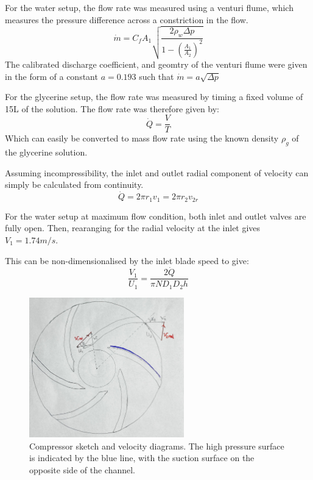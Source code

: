 \documentclass{article}
\begin{document}
For the water setup, the flow rate was measured using a venturi flume, which measures the pressure difference across a constriction in the flow.
\begin{equation}
    \dot{m} = C_f A_1 \sqrt{\frac{2\rho_w \Delta p}{1 - \left( \frac{A_1}{A_2} \right)^2}}
\end{equation}
The calibrated discharge coefficient, and geomtry of the venturi flume were given in the form of a constant $a=0.193$ such that $\dot{m}=a \sqrt{\Delta p}$

For the glycerine setup, the flow rate was measured by timing a fixed volume of 15L of the solution.
The flow rate was therefore given by:
\begin{equation}
    \dot{Q} = \frac{V}{T}
\end{equation}
Which can easily be converted to mass flow rate using the known density $\rho_g$ of the glycerine solution.


Assuming incompressibility, the inlet and outlet radial component of velocity can simply be calculated from continuity.
\begin{equation}
    \dot{Q} = 2\pi r_1 v_1 = 2\pi r_2 v_{2r}
\end{equation}

For the water setup at maximum flow condition, both inlet and outlet valves are fully open.
Then, rearanging for the radial velocity at the inlet gives $V_1 = 1.74 m/s$.

This can be non-dimensionalised by the inlet blade speed to give:
\begin{equation}
    \frac{V_1}{U_1} = \frac{2\dot{Q}}{\pi N D_1 D_2 h}
\end{equation}


\begin{figure}[H]
    \centering
    \includegraphics[width=0.6\textwidth]{velocity_diagrams.jpg}
    \caption{Compressor sketch and velocity diagrams. The high pressure surface is indicated by the blue line, with the suction surface on the opposite side of the channel.}
    \label{fig:vel_diagrams}
\end{figure}
\end{document}
